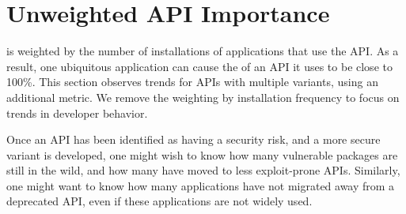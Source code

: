 \section{Unweighted API Importance}
\label{sec:syspop:security}

\Usagemetric{} is weighted by the number of installations
of applications that use the API.
As a result, one ubiquitous application can cause the \usagemetric{} of an API it uses to be close to 100\%.
This section observes trends for APIs with multiple variants, using an additional 
\unwusagemetric{} metric. 
We remove the weighting by installation frequency to focus on 
trends in developer behavior.



Once an API has been identified as having a security risk, and a more secure variant
is developed, one might wish to know how many 
vulnerable packages are still in the wild,
and how many have moved to less exploit-prone APIs.
Similarly, one might want to know how many applications have not migrated away from a deprecated API,
even if these applications are not widely used.

\vspace{0.1in}
{\noindent
{}}
\vspace{0.1in}


